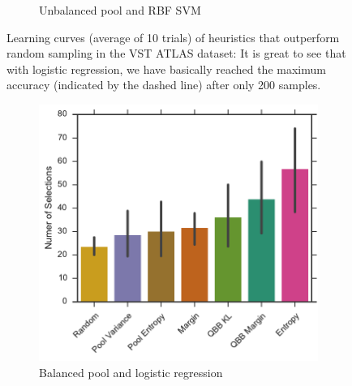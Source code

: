 \begin{figure}[p]
\begin{subfigure}{.5\textwidth}
		\caption{Unbalanced pool and RBF SVM}
		\label{fig:vstatlas_ur_ind_upper}
	\end{subfigure}
	\caption[Learning curves of heuristics better than random (VST ATLAS)]{
		Learning curves (average of 10 trials) of heuristics that outperform random sampling in the VST ATLAS dataset: It is great to see that with logistic regression, we have basically reached
        the maximum accuracy (indicated by the dashed line) after only 200 samples.
	}
	\label{fig:vstatlas_ind_upper}
\end{figure}


\begin{figure}[p]
    \centering
    \begin{subfigure}{.5\textwidth}
        \centering
        \includegraphics[width=\textwidth]{figures/5_thompson/vstatlas_bl_no_selections}
        \caption{Balanced pool and logistic regression}
        \label{fig:vstatlas_bl_no_selections}
    \end{subfigure}%
    \begin{subfigure}{.5\textwidth}
        \centering

\end{subfigure}
\end{figure}
